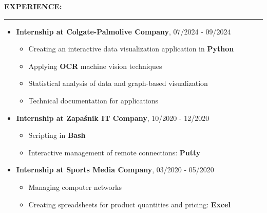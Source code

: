\documentclass[10pt]{article}
\newcommand{\longline}{\rule{19.6cm}{1pt}}
\begin{document}
\noindent \fontsize{14pt}{14pt}\selectfont \textbf{\color{Violet}EXPERIENCE:}
\fontsize{10pt}{10pt}\selectfont

\noindent \longline 
\begin{itemize}[leftmargin=*]
    \item \textbf{Internship at Colgate-Palmolive Company}, 07/2024 - 09/2024
    \begin{itemize}
        \item Creating an interactive data visualization application in \textbf{Python}
        \item Applying \textbf{OCR} machine vision techniques 
        \item Statistical analysis of data and graph-based visualization
        \item Technical documentation for applications
    \end{itemize}
    \item \textbf{Internship at Zapaśnik IT Company}, 10/2020 - 12/2020
    \begin{itemize}
        \item Scripting in \textbf{Bash} 
        \item Interactive management of remote connections: \textbf{Putty}
    \end{itemize}
    \item \textbf{Internship at Sports Media Company}, 03/2020 - 05/2020
    \begin{itemize}
        \item Managing computer networks
        \item Creating spreadsheets for product quantities and pricing: \textbf{Excel}
    \end{itemize}
\end{itemize}
\end{document}
